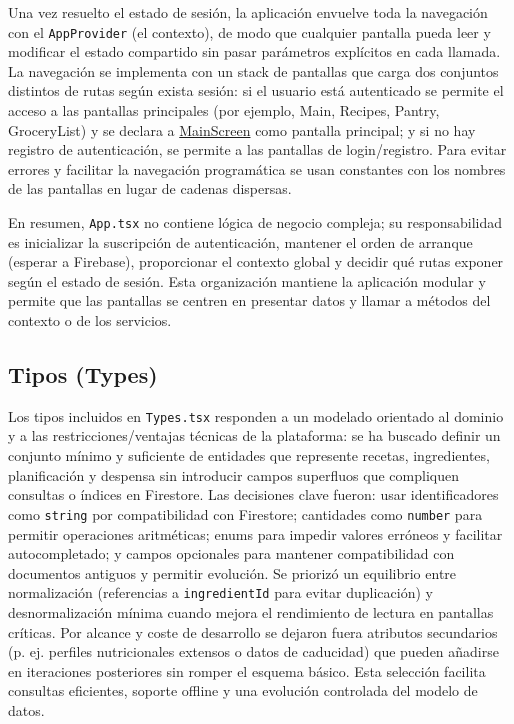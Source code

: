 \documentclass[twoside, openright, 11pt]{report}
\begin{document}
			Una vez resuelto el estado de sesión, la aplicación envuelve toda la navegación con el \texttt{AppProvider} (el contexto), de modo que cualquier pantalla pueda leer y modificar el estado compartido sin pasar parámetros explícitos en cada llamada. La navegación se implementa con un stack de pantallas que carga dos conjuntos distintos de rutas según exista sesión: si el usuario está autenticado se permite el acceso a las pantallas principales (por ejemplo, Main, Recipes, Pantry, GroceryList) y se declara a \hyperref[MainScreen]{MainScreen} como pantalla principal; y si no hay registro de autenticación, se permite a las pantallas de login/registro. Para evitar errores y facilitar la navegación programática se usan constantes con los nombres de las pantallas en lugar de cadenas dispersas.
			
			En resumen, \texttt{App.tsx} no contiene lógica de negocio compleja; su responsabilidad es inicializar la suscripción de autenticación, mantener el orden de arranque (esperar a Firebase), proporcionar el contexto global y decidir qué rutas exponer según el estado de sesión. Esta organización mantiene la aplicación modular y permite que las pantallas se centren en presentar datos y llamar a métodos del contexto o de los servicios.
						
		\subsection{Tipos (Types)}\label{Types}
			Los tipos incluidos en \texttt{Types.tsx} responden a un modelado orientado al dominio y a las restricciones/ventajas técnicas de la plataforma: se ha buscado definir un conjunto mínimo y suficiente de entidades que represente recetas, ingredientes, planificación y despensa sin introducir campos superfluos que compliquen consultas o índices en Firestore. Las decisiones clave fueron: usar identificadores como \texttt{string} por compatibilidad con Firestore; cantidades como \texttt{number} para permitir operaciones aritméticas; enums para impedir valores erróneos y facilitar autocompletado; y campos opcionales para mantener compatibilidad con documentos antiguos y permitir evolución. Se priorizó un equilibrio entre normalización (referencias a \texttt{ingredientId} para evitar duplicación) y desnormalización mínima cuando mejora el rendimiento de lectura en pantallas críticas. Por alcance y coste de desarrollo se dejaron fuera atributos secundarios (p. ej. perfiles nutricionales extensos o datos de caducidad) que pueden añadirse en iteraciones posteriores sin romper el esquema básico. Esta selección facilita consultas eficientes, soporte offline y una evolución controlada del modelo de datos.
			
\end{document}
